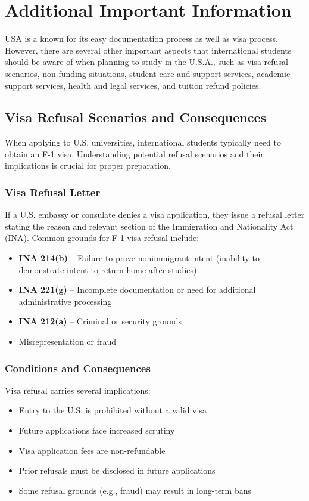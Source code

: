 \section{Additional Important Information}
USA is a known for its easy documentation process as well as visa process. However, there are several other important aspects that international students should be aware of when planning to study in the U.S.A., such as visa refusal scenarios, non-funding situations, student care and support services, academic support services, health and legal services, and tuition refund policies.
\subsection{Visa Refusal Scenarios and Consequences}
When applying to U.S. universities, international students typically need to obtain an F-1 visa. Understanding potential refusal scenarios and their implications is crucial for proper preparation.

\subsubsection{Visa Refusal Letter}
If a U.S. embassy or consulate denies a visa application, they issue a refusal letter stating the reason and relevant section of the Immigration and Nationality Act (INA). Common grounds for F-1 visa refusal include:

\begin{itemize}
    \item \textbf{INA 214(b)} -- Failure to prove nonimmigrant intent (inability to demonstrate intent to return home after studies)
    \item \textbf{INA 221(g)} -- Incomplete documentation or need for additional administrative processing
    \item \textbf{INA 212(a)} -- Criminal or security grounds
    \item Misrepresentation or fraud
\end{itemize}

\subsubsection{Conditions and Consequences}
Visa refusal carries several implications:
\begin{itemize}
    \item Entry to the U.S. is prohibited without a valid visa
    \item Future applications face increased scrutiny
    \item Visa application fees are non-refundable
    \item Prior refusals must be disclosed in future applications
    \item Some refusal grounds (e.g., fraud) may result in long-term bans
\end{itemize}

